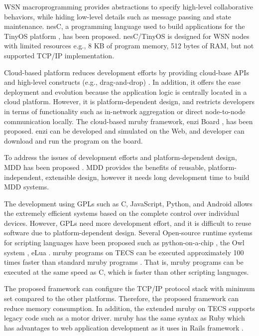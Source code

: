 \documentclass[JIP]{ipsj_v2/UTF8/ipsj}
\begin{document}
WSN macroprogramming provides abstractions to specify high-level collaborative behaviors, while hiding low-level details such as message passing and state maintenance.
nesC, a programming language used to build applications for the TinyOS platform \cite{par:nesc}, has been proposed.
nesC/TinyOS is designed for WSN nodes with limited resources e.g., 8 KB of program memory, 512 bytes of RAM, but not supported TCP/IP implementation.

Cloud-based platform reduces development efforts by providing cloud-base APIs and high-level constructs (e.g., drag-and-drop) \cite{par:cloud-based}.
In addition, it offers the ease deployment and evolution because the application logic is centrally located in a cloud platform.
However, it is platform-dependent design, and restricts developers in terms of functionality such as in-network aggregation or direct node-to-node communication locally.
The cloud-based mruby framework, enzi Board \cite{url:enzi}, has been proposed.
enzi can be developed and simulated on the Web, and developer can download and run the program on the board.

To address the issues of development efforts and platform-dependent design, MDD has been proposed \cite{par:MDD}.
MDD provides the benefits of reusable, platform-independent, extensible design, however it needs long development time to build MDD systems.

The development using GPLs such as C, JavaScript, Python, and Android allows the extremely efficient systems based on the complete control over individual devices.
However, GPLs need more development effort, and it is difficult to reuse software due to platform-dependent design.
Several Open-source runtime systems for scripting languages have been proposed such as python-on-a-chip \cite{url:python-on-a-chip}, the Owl system \cite{par:owl}, eLua \cite{url:eLua}.
mruby programs on TECS can be executed approximately 100 times faster than standard mruby programs \cite{par:mrubyonTECS}.
That is, mruby programs can be executed at the same speed as C, which is faster than other scripting languages.

The proposed framework can configure the TCP/IP protocol stack with minimum set compared to the other platforms.
Therefore, the proposed framework can reduce memory consumption.
In addition, the extended mruby on TECS supports legacy code such as a motor driver.
mruby has the same syntax as Ruby which has advantages to web application development as it uses in Rails framework \cite{url:rubyonrails}.
\end{document}

